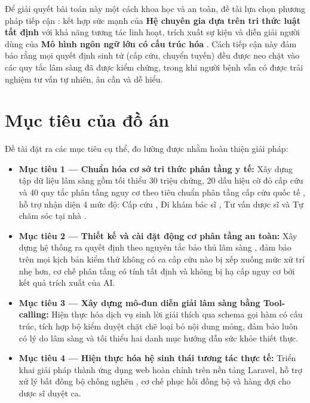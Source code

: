 Để giải quyết bài toán này một cách khoa học và an toàn, đề tài lựa chọn phương
pháp tiếp cận : kết hợp sức mạnh
của \textbf{Hệ chuyên gia dựa trên tri thức luật tất định}  \cite{Buchanan1984} với khả năng tương tác linh hoạt, trích
xuất sự kiện và diễn giải người dùng của \textbf{Mô hình ngôn ngữ lớn có cấu trúc
hóa}  \cite{Schick2023}. Cách tiếp cận này đảm bảo
rằng mọi quyết định sinh tử (cấp cứu, chuyển tuyến) đều được neo chặt vào các quy
tắc lâm sàng đã được kiểm chứng, trong khi người bệnh vẫn có được trải nghiệm tư
vấn tự nhiên, ân cần và dễ hiểu.

\section*{Mục tiêu của đồ án}
{}

Đề tài đặt ra các mục tiêu cụ thể, đo lường được nhằm hoàn thiện giải pháp:
\begin{itemize}[leftmargin=1.6em, itemsep=2pt]
  \item \textbf{Mục tiêu 1 — Chuẩn hóa cơ sở tri thức phân tầng y tế:} Xây dựng
        tập dữ liệu lâm sàng gồm tối thiểu 30 triệu chứng, 20 dấu hiệu cờ đỏ cấp
        cứu và 40 quy tắc phân tầng nguy cơ theo tiêu chuẩn phân tầng cấp cứu
        quốc tế \cite{Mackway2014}, hỗ trợ nhận diện 4 mức độ: Cấp cứu
        , Đi khám bác sĩ , Tư vấn dược sĩ
         và Tự chăm sóc tại nhà .
  \item \textbf{Mục tiêu 2 — Thiết kế và cài đặt động cơ phân tầng an toàn:} Xây
        dựng hệ thống ra quyết định theo nguyên tắc bảo thủ lâm sàng
        , đảm bảo trên mọi kịch bản kiểm thử không
        có ca cấp cứu nào bị xếp xuống mức xử trí nhẹ hơn, cơ chế phân tầng có
        tính tất định và không bị hạ cấp nguy cơ bởi kết quả trích xuất của AI.
  \item \textbf{Mục tiêu 3 — Xây dựng mô-đun diễn giải lâm sàng bằng Tool-calling:}
        Hiện thực hóa dịch vụ sinh lời giải thích  qua schema
        gọi hàm có cấu trúc, tích hợp bộ kiểm duyệt chặt chẽ 
        loại bỏ nội dung mỏng, đảm bảo luôn có lý do lâm sàng và tối thiểu hai
        danh mục hướng dẫn sức khỏe thiết thực.
  \item \textbf{Mục tiêu 4 — Hiện thực hóa hệ sinh thái tương tác thực tế:} Triển
        khai giải pháp thành ứng dụng web hoàn chỉnh trên nền tảng Laravel, hỗ
        trợ xử lý bất đồng bộ chống nghẽn , cơ chế phục hồi
        đồng bộ  và hàng đợi cho dược sĩ duyệt ca.
\end{itemize}

